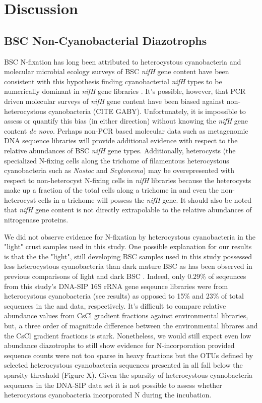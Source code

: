 \section{Discussion}

\subsection{BSC Non-Cyanobacterial Diazotrophs}
BSC N-fixation has long been attributed to heterocystous cyanobacteria and molecular microbial ecology surveys of BSC \textit{nifH} gene content have been consistent with this hypothesis finding cyanobacterial \textit{nifH} types to be numerically dominant in \textit{nifH} gene libraries \cite{Yeager, 14766579, Yeager_2012}. It's possible, however, that PCR driven molecular surveys of \textit{nifH} gene content have been biased against non-heterocystous cyanobacteria (CITE GABY). Unfortunately, it is impossible to assess or quantify this bias (in either direction) without knowing the \textit{nifH} gene content \textit{de novo}. Perhaps non-PCR based molecular data such as metagenomic DNA sequence libraries will provide additional evidence with respect to the relative abundances of BSC \textit{nifH} gene types. Additionally, heterocysts (the specialized N-fixing cells along the trichome of filamentous heterocystous cyanobacteria such as \textit{Nostoc} and \textit{Scytonema}) may be overepresented with respect to non-heterocyst N-fixing cells in \textit{nifH} libraries because the heterocysts make up a fraction of the total cells along a trichome in and even the non-heterocyst cells in a trichome will possess the \textit{nifH} gene. It should also be noted that \textit{nifH} gene content is not directly extrapolable to the relative abundances of nitrogenase proteins.

We did not observe evidence for N-fixation by heterocystous cyanobacteria in the "light" crust samples used in this study. One possible explanation for our results is that the the "light", still developing BSC samples used in this study possessed less heterocystous cyanobacteria than dark mature BSC as has been observed in previous comparisons of light and dark BSC \cite{14766579}. Indeed, only 0.29\% of seqeunces from this study's DNA-SIP 16S rRNA gene seqeunce libraries were from heterocystous cyanobacteria (see results) as opposed to 15\% and 23\% of total sequences in the \citet{Steven_2013} and \citet{Garcia_Pichel_2013} data, respectively. It's difficult to compare relative abundance values from CsCl gradient fractions against environmental libraries, but, a three order of magnitude difference between the environmental librares and the CsCl gradient fractions is stark. Nonetheless, we would still expect even low abundance diazotrophs to still show evidence for N-incorporation provided sequence counts were not too sparse in heavy fractions but the OTUs defined by selected heterocystous cyanobacteria sequences presented in \citet{Yeager} all fall below the sparsity threshold (Figure X). Given the sparsity of heterocystous cyanobacteria sequences in the DNA-SIP data set it is not possible to assess whether heterocystous cyanobacteria incorporated N during the incubation.

